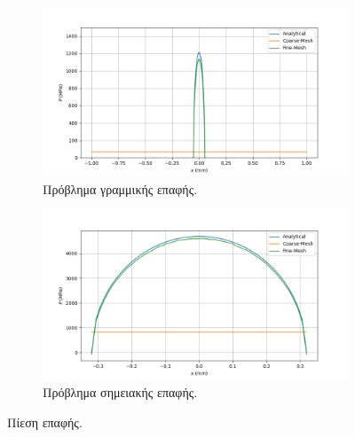 \documentclass{article}
\begin{document}
\begin{figure}[H]
    \centering
    \begin{subfigure}{0.49\linewidth}
        \centering
        \includegraphics[width=\linewidth]{media/plin.png}
        \caption{Πρόβλημα γραμμικής επαφής.}
    \end{subfigure}
    \hfill
    \begin{subfigure}{0.49\linewidth}
        \centering
        \includegraphics[width=\linewidth]{media/pp.png}
        \caption{Πρόβλημα σημειακής επαφής.}
    \end{subfigure}
    \caption{Πίεση επαφής.}
    \label{fig:b1}
\end{figure}
\end{document}
